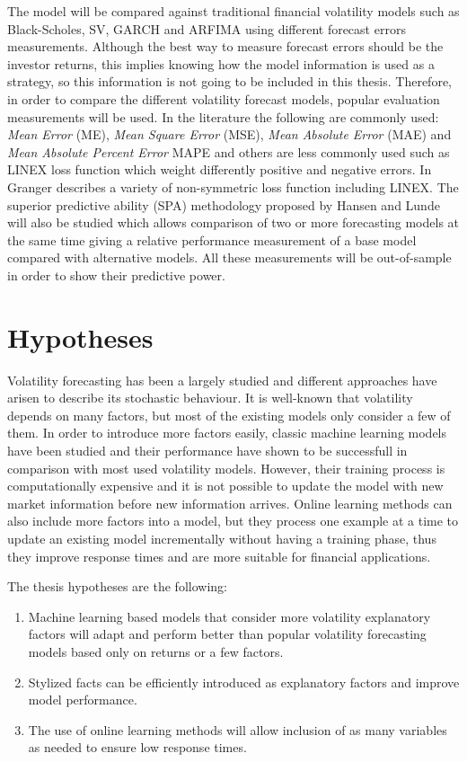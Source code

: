 The model will be compared against traditional financial volatility models such as Black-Scholes, SV, GARCH and ARFIMA using different forecast errors measurements. Although the best way to measure forecast errors should be the investor returns, this implies knowing how the model information is used as a strategy, so this information is not going to be included in this thesis. Therefore, in order to compare the different volatility forecast models, popular evaluation measurements will be used. In the literature the following are commonly used: {\em Mean Error} (ME), {\em Mean Square Error} (MSE), {\em Mean Absolute Error} (MAE) and {\em Mean Absolute Percent Error} {MAPE} and others are less commonly used such as LINEX loss function which weight differently positive and negative errors. In ~\cite{granger1999} Granger describes a variety of non-symmetric loss function including LINEX. The superior predictive ability (SPA) methodology proposed by Hansen and Lunde~\cite{hansen+lunde2006} will also be studied 
which allows comparison of two or more forecasting models at the same time giving a relative performance measurement of a base model compared with alternative models.  All these measurements will be out-of-sample in order to show their predictive power.


\section{Hypotheses}


Volatility forecasting has been a largely studied and different approaches have arisen to describe its stochastic behaviour. It is well-known that volatility depends on many factors, but most of the existing models only consider a few of them. In order to introduce more factors easily, classic machine learning models have been studied and their performance have shown to be successfull in comparison with most used volatility models. However, their training process is computationally expensive and it is not possible to update the model with new market information before new information arrives. Online learning methods can also include more factors into a model, but they process one example at a time to update an existing model incrementally without having a training phase, thus they improve response times and are more suitable for financial applications.


The thesis hypotheses are the following:

\begin{enumerate} 
\item Machine learning based models that consider more volatility explanatory factors will adapt and perform better than popular volatility forecasting models based only on returns or a few factors.
\item Stylized facts can be efficiently introduced as explanatory factors and improve model performance.
\item The use of online learning methods will allow inclusion of as many variables as needed to ensure low response times.  
\end{enumerate}

